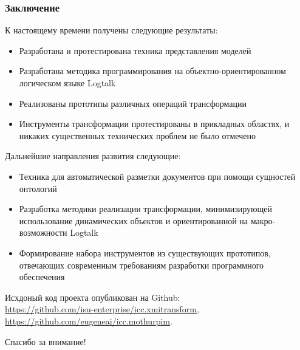 \documentclass[handout]{beamer}
\begin{document}
\begin{frame}
  \frametitle{Заключение}
  К настоящему времени получены следующие результаты:
  \begin{itemize}
  \item Разработана и протестирована техника представления моделей
  \item Разработана методика программирования на объектно-ориентированном логическом языке Logtalk
  \item Реализованы прототипы различных операций трансформации
  \item Инструменты трансформации протестированы в прикладных областях, и никаких существенных технических проблем не было отмечено
  \end{itemize}
  Дальнейшие направления развития следующие:
  \begin{itemize}
  \item Техника для автоматической разметки документов при помощи сущностей онтологий
  \item Разработка методики реализации трансформации, минимизирующей использование динамических объектов и ориентированной на макро-возможности Logtalk
  \item Формирование набора инструментов из существующих прототипов, отвечающих современным требованиям разработки программного обеспечения
  \end{itemize}
  Исхдоный код проекта опубликован на Github:\\
\url{https://github.com/isu-enterprise/icc.xmitransform},\\ \url{https://github.com/eugeneai/icc.mothurpim}.
\end{frame}



\begin{frame}
  \begin{center}
    \Large Спасибо за внимание!
\end{center}
\end{frame}
\end{document}
